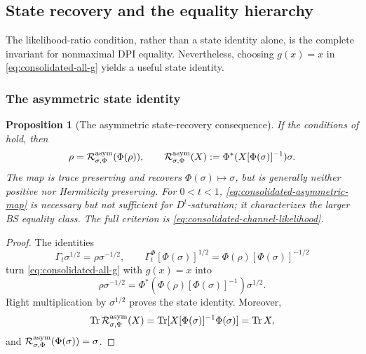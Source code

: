\documentclass[11pt]{article}
\newtheorem{proposition}[proposition]{Proposition}
\theoremstyle{remark}
\newcommand{\1}{\mathbbm{1}}
\begin{document}
\subsection{State recovery and the equality hierarchy}

The likelihood-ratio condition, rather than a state identity alone, is
the complete invariant for nonmaximal DPI equality.  Nevertheless,
choosing $g(x)=x$ in \eqref{eq:consolidated-all-g} yields a useful
state identity.

\subsubsection{The asymmetric state identity}

\begin{proposition}[The asymmetric state-recovery consequence]
\label{prop:consolidated-asymmetric-recovery}
If the conditions of
 hold, then
\begin{equation}
 \rho=\mathcal R_{\sigma,\Phi}^{\rm asym}(\Phi(\rho)),
 \qquad
 \mathcal R_{\sigma,\Phi}^{\rm asym}(X)
 :=\Phi^*(X[\Phi(\sigma)]^{-1})\sigma.
 \label{eq:consolidated-asymmetric-map}
\end{equation}
The map is trace preserving and recovers $\Phi(\sigma)\mapsto\sigma$,
but is generally neither positive nor Hermiticity preserving.  For
$0<t<1$, \eqref{eq:consolidated-asymmetric-map} is necessary but
not sufficient for $D^t$-saturation; it characterizes the larger
BS equality class.  The full criterion is
\eqref{eq:consolidated-channel-likelihood}.
\end{proposition}

\begin{proof}
The identities
\begin{equation}
 \Gamma_t\sigma^{1/2}=\rho\sigma^{-1/2},\qquad
 \Gamma_t^\Phi[\Phi(\sigma)]^{1/2}=\Phi(\rho)[\Phi(\sigma)]^{-1/2}
\end{equation}
turn \eqref{eq:consolidated-all-g} with $g(x)=x$ into
\begin{equation}
 \rho\sigma^{-1/2}
 =\Phi^*(\Phi(\rho)[\Phi(\sigma)]^{-1})\sigma^{1/2}.
\end{equation}
Right multiplication by $\sigma^{1/2}$ proves the state identity.
Moreover,
\begin{equation}
 \operatorname{Tr}\mathcal R_{\sigma,\Phi}^{\rm asym}(X)
 =\operatorname{Tr}[X[\Phi(\sigma)]^{-1}\Phi(\sigma)]=\operatorname{Tr} X,
\end{equation}
and $\mathcal R_{\sigma,\Phi}^{\rm asym}(\Phi(\sigma))=\sigma$.
\end{proof}
\end{document}
